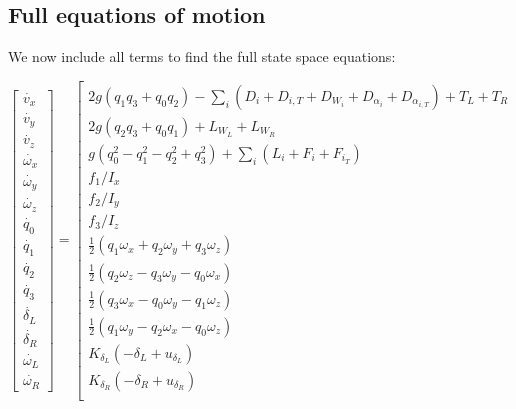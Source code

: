 \subsection{Full equations of motion}
\label{sec:fulleqs}

We now include all terms to find the full state space equations:

\begin{equation}
\left[
\begin{matrix}
    \dot{v_x} \\
    \dot{v_y} \\
    \dot{v_z} \\
    \dot{\omega_x} \\ 
    \dot{\omega_y} \\
    \dot{\omega_z} \\
    \dot{q_0} \\
    \dot{q_1} \\
    \dot{q_2} \\
    \dot{q_3} \\
    \dot{\delta_L} \\
    \dot{\delta_R} \\
    \dot{\omega_L} \\
    \dot{\omega_R} 
\end{matrix} \right] 
=
\left[ \begin{matrix}
 2g(q_1 q_3 + q_0 q_2)
    - \sum_i \left(
     D_i
    + D_{i,T}
    + D_{W_i}
    + D_{\alpha_i}
    + D_{\alpha_{i,T}} \right)
    + T_L + T_R \\
 2g(q_2 q_3 + q_0 q_1)
 + L_{W_L} + L_{W_R} \\
 g(q_0^2 - q_1^2 - q_2^2 + q_3^2)
 + \sum_i \left( L_i + F_i + F_{i_T}
  \right) \\
f_1/I_x \\
f_2/I_y \\
f_3/I_z \\
        \frac{1}{2} (q_1 \omega_x + q_2 \omega_y + q_3 \omega_z) & \\
        \frac{1}{2} (q_2 \omega_z - q_3 \omega_y - q_0 \omega_x) & \\
        \frac{1}{2} (q_3 \omega_x - q_0 \omega_y - q_1 \omega_z) & \\
        \frac{1}{2} (q_1 \omega_y - q_2 \omega_x - q_0 \omega_z) & \\
K_{\delta_L} (-\delta_L + u_{\delta_L}) \\
K_{\delta_R} (-\delta_R + u_{\delta_R}) \\

\end{matrix}
\end{equation}
